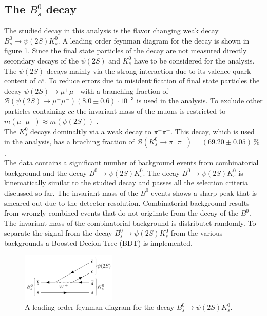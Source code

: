 \subsection{The $B_s^0$ decay}
The studied decay in this analysis is the flavor changing weak decay $B_s^0 \rightarrow \psi(2S) K_s^0$.
A leading order feynman diagram for the decay is shown in figure \ref{f2}. 
Since the final state particles of the decay are not measured directly secondary decays of the $\psi(2S)$ and $K_s^0$ 
have to be considered for the analysis. 
The $\psi(2S)$ decays mainly via the strong interaction due to its valence quark content of $c \overline{c}$. 
To reduce errors due to misidentification of final state 
particles the decay $\psi(2S) \rightarrow \mu^+ \mu^-$ with a branching fraction of $\mathcal{B}(\psi(2S) \rightarrow \mu^+ \mu^-) 
(8.0 \pm 0.6) \cdot 10^{-3}$ \cite{pdg} is used in the analysis. To exclude other particles containing $c\overline{c}$ 
the invariant mass of the muons is restricted to $m(\mu^+ \mu^- ) \approx m(\psi(2S))$ .\\ 
The $K_s^0$ decays dominaltly via a weak decay to $\pi^+ \pi^-$. This decay, which is used in the analysis, has a braching fraction of 
$\mathcal{B}(K_s^0 \rightarrow \pi^+ \pi^-) = (69.20 \pm 0.05) \, \%$ \cite{pdg}. \\
The data contains a significant number of background events from combinatorial background and the decay $B^0 \rightarrow \psi(2S) K_s^0$. 
The decay $B^0 \rightarrow \psi(2S) K_s^0$ is kinematically similar to the studied decay and passes all the selection criteria discussed so far. 
The invariant mass of the $B^0$ events shows a sharp peak that is smeared out due to the detector resolution. 
Combinatorial background results from wrongly combined events that do not originate from the decay of the $B^0$. The invariant mass of the 
combinatorial background is distributet randomly. 
To separate the signal from the decay $B_s^0 \rightarrow \psi(2S) K_s^0$ from the various backgrounds a Boosted Decion Tree (BDT) is implemented. 

  \begin{figure}[!htb]
    \centering
    \includegraphics[width=0.4\textwidth]{graphics/image.png}
    \caption{A leading order feynman diagram for the decay $B_s^0 \rightarrow \psi(2S) K_s^0$. \cite{sample}}
    \label{f2}
  \end{figure}